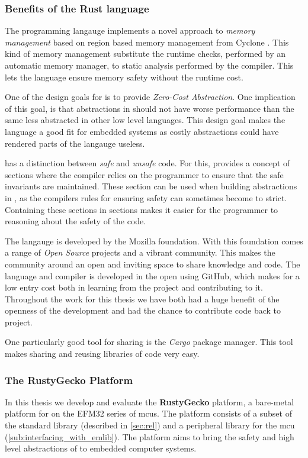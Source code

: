 \subsubsection{Benefits of the Rust language}
The {\rust} programming langauge implements a novel approach to \emph{memory management} based on region based memory management from Cyclone \cite{Grossman2002,Swamy2006}.
This kind of memory management substitute the runtime checks, performed by an automatic memory manager, to static analysis performed by the compiler.
This lets the {\rust} language ensure memory safety without the runtime cost.

One of the design goals for {\rust} is to provide \emph{Zero-Cost Abstraction}.
One implication of this goal, is that abstractions in {\rust} should not have worse performance than the same less abstracted in other low level languages.
This design goal makes the language a good fit for embedded systems as costly abstractions could have rendered parts of the langauge useless.

{\rust} has a distinction between \emph{safe} and \emph{unsafe} code.
For this, {\rust} provides a concept of {\unsafe} sections where the compiler relies on the programmer to ensure that the safe invariants are maintained.
These section can be used when building abstractions in {\rust}, as the compilers rules for ensuring safety can sometimes become to strict.
Containing these sections in {\unsafe} sections makes it easier for the programmer to reasoning about the safety of the code.

The {\rust} langauge is developed by the Mozilla foundation.
With this foundation comes a range of \emph{Open Source} projects and a vibrant community.
This makes the community around {\rust} an open and inviting space to share knowledge and code.
The {\rust} language and compiler is developed in the open using GitHub, which makes for a low entry cost both in learning from the project and contributing to it.
Throughout the work for this thesis we have both had a huge benefit of the openness of the development and had the chance to contribute code back to project.

One particularly good tool for sharing {\rust} is the \emph{Cargo} package manager.
This tool makes sharing and reusing libraries of code very easy.



\subsubsection{The RustyGecko Platform}

In this thesis we develop and evaluate the \textbf{RustyGecko} platform, a bare-metal platform for {\rust} on the EFM32 series of \glspl{mcu}.
The platform consists of a subset of the {\rust} standard library (described in \autoref{sec:rel}) and a peripheral library for the \gls{mcu} (\autoref{sub:interfacing_with_emlib}).
The platform aims to bring the safety and high level abstractions of {\rust} to embedded computer systems.
